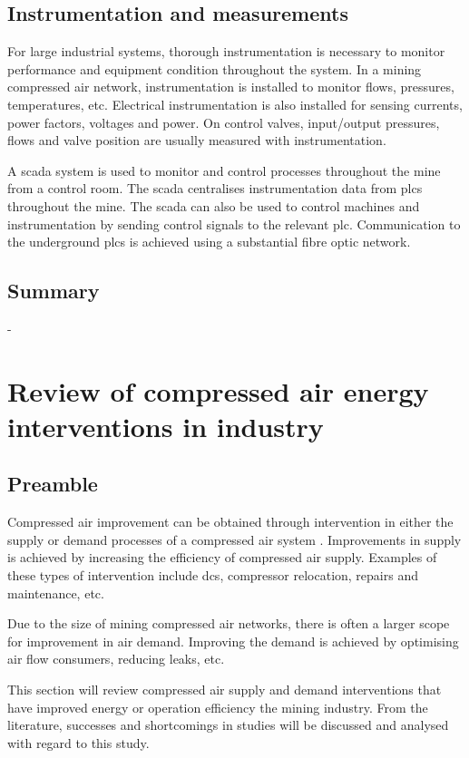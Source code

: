 \subsection{Instrumentation and measurements}
For large industrial systems, thorough instrumentation is necessary to monitor performance and equipment condition throughout the system. In a mining compressed air network, instrumentation is installed to monitor flows, pressures, temperatures, etc. Electrical instrumentation is also installed for sensing currents, power factors, voltages and power. On control valves, input/output pressures, flows and valve position are usually measured with instrumentation.	
\par
A \gls{scada} system is used to monitor and control processes throughout the mine from a control room. The \gls{scada} centralises instrumentation data from \glspl{plc} throughout the mine. The \gls{scada} can also be used to control machines and instrumentation by sending control signals to the relevant \gls{plc}.  Communication to the underground \glspl{plc} is achieved using a substantial fibre optic network\cite{schroeder2009energy}.
\subsection{Summary}
-
\section{Review of compressed air energy interventions in industry}
	\subsection{Preamble}
		Compressed air improvement can be obtained through intervention in either the supply or demand processes of a compressed air system \cite{Kriel2014Masters}. Improvements in supply is achieved by increasing the efficiency of compressed air supply. Examples of these types of intervention include \gls{dcs}, compressor relocation, repairs and maintenance, etc. 
		\par
		Due to the size of mining compressed air networks, there is often a larger scope for improvement in air demand. Improving the demand is achieved by optimising air flow consumers, reducing leaks, etc.
		\par
	 	 This section will review compressed air supply and demand interventions that have improved energy or operation efficiency the mining industry. From the literature, successes and shortcomings in studies will be discussed and analysed with regard to this study.
	 	
